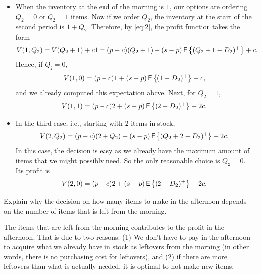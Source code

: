 \begin{question}
\begin{solution}
\begin{itemize}
\item When the inventory at the end of the morning is $1$,  our options are ordering $Q_2=0$ or $Q_2=1$ items. Now if we order $Q_2$, the inventory at the start of the second period is $1+Q_2$. Therefore, by \eqref{eq:2}, the profit function takes the form
    \begin{equation*}
V(1,Q_2) = V(Q_2+1) + c 1 = (p -c)(Q_2+1)  + (s-p)\,\mathsf{E}\left\{(Q_2+1-D_2)^+\right\} + c.
\end{equation*}
Hence, if $Q_2=0$, 
    \begin{equation*}
V(1, 0) = (p-c)1 + (s-p)\,\mathsf{E}\left\{(1-D_2)^+\right\} + c,
\end{equation*}
and we already computed this expectation above. Next, for $Q_2=1$, 
    \begin{equation*}
V(1, 1) = (p -c)2  + (s-p)\,\mathsf{E}\left\{(2-D_2)^+\right\} + 2c.
\end{equation*}
  
  \item In the third case, i.e., starting with $2$ items in stock, 
    \begin{equation*}
V(2, Q_2) = (p -c)(2+Q_2)  + (s-p)\,\mathsf{E}\left\{(Q_2+2-D_2)^+\right\} + 2c.
\end{equation*}
In this case, the  decision is easy as we already have the maximum amount of items that we might possibly need. So the only reasonable choice is $Q_2=0$.  Its profit is 
    \begin{equation*}
V(2,0) = (p-c)2 + (s-p)\,\mathsf{E}\left\{(2-D_2)^+\right\} + 2c.
\end{equation*}
\end{itemize}
\end{solution}
\end{question}

\begin{question}
Explain why the decision on how many items to make in the afternoon depends on the number of items that is left from the morning. 

\begin{solution}
The items that are left from the morning contributes to the profit in the afternoon. That is due to two reasons: (1) We don't have to pay in the afternoon to acquire what we already have in stock as leftovers from the morning (in other words, there is no purchasing cost for leftovers), and (2) if there are more leftovers  than what is actually needed, it is optimal  to not make new items. 
\end{solution}
\end{question}


